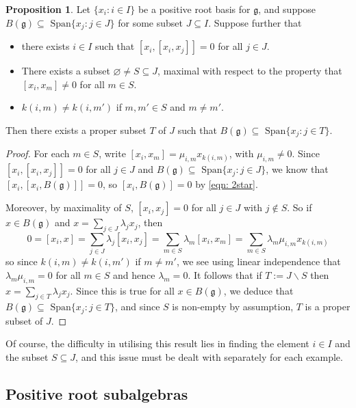 \documentclass[12pt,a4paper]{article}
\theoremstyle{definition}
\newtheorem{propn}[thm]{Proposition}
\theoremstyle{remark}
\theoremstyle{custthm}
\begin{document}
\begin{propn}\label{propn: calculating B(g) using root bases}
Let $\{x_i:i\in I\}$ be a positive root basis for $\mathfrak{g}$, and suppose $B(\mathfrak{g})\subseteq\text{ Span}\{x_j:j\in J\}$ for some subset $J\subseteq I$. Suppose further that
\begin{itemize}
\item there exists $i\in I$ such that $[x_i,[x_i,x_j]]=0$ for all $j\in J$.

\item There exists a subset $\varnothing\neq S\subseteq J$, maximal with respect to the property that $[x_i,x_m]\neq 0$ for all $m\in S$.

\item $k(i,m)\neq k(i,m')$ if $m,m'\in S$ and $m\neq m'$.
\end{itemize}
Then there exists a proper subset $T$ of $J$ such that $B(\mathfrak{g})\subseteq\text{ Span}\{x_j:j\in T\}$.
\end{propn}

\begin{proof}
For each $m\in S$, write $[x_i,x_m]=\mu_{i,m}x_{k(i,m)}$, with $\mu_{i,m}\neq 0$. Since $[x_i,[x_i,x_j]]=0$ for all $j\in J$ and $B(\mathfrak{g})\subseteq\text{ Span}\{x_j:j\in J\}$, we know that $[x_i,[x_i,B(\mathfrak{g})]]=0$, so $[x_i,B(\mathfrak{g})]=0$ by \eqref{eqn: 2star}.

Moreover, by maximality of $S$, $[x_i,x_j]=0$ for all $j\in J$ with $j\notin S$. So if $x\in B(\mathfrak{g})$ and $x=\underset{j\in J}{\sum}\lambda_j x_j$, then $$0=[x_i,x]=\underset{j\in J}{\sum}\lambda_j [x_i,x_j]=\underset{m\in S}{\sum}\lambda_m [x_i,x_m]=\underset{m\in S}{\sum}\lambda_m\mu_{i,m}x_{k(i,m)}$$ so since $k(i,m)\neq k(i,m')$ if $m\neq m'$, we see using linear independence that $\lambda_m\mu_{i,m}=0$ for all $m\in S$ and hence $\lambda_m=0$. It follows that if $T:=J\backslash S$ then $x=\underset{j\in T}{\sum}\lambda_j x_j$. Since this is true for all $x\in B(\mathfrak{g})$, we deduce that $B(\mathfrak{g})\subseteq\text{ Span}\{x_j:j\in T\}$, and since $S$ is non-empty by assumption, $T$ is a proper subset of $J$.\end{proof}

Of course, the difficulty in utilising this result lies in finding the element $i\in I$ and the subset $S\subseteq J$, and this issue must be dealt with separately for each example.

\subsection{Positive root subalgebras}
\end{document}
